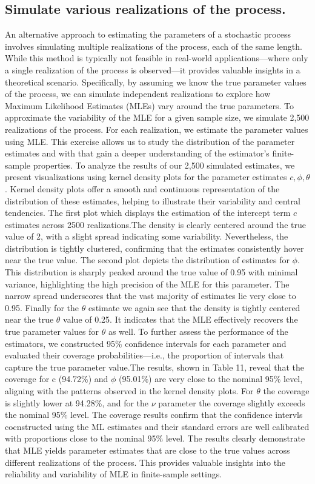 \documentclass[12pt]{article}
\begin{document}
\subsection{Simulate various realizations of the process.}
An alternative approach to estimating the parameters of a stochastic process involves simulating multiple realizations of the process, each of the same length. 
While this method is typically not feasible in real-world applications—where only a single realization of the process is observed—it provides valuable insights in a theoretical scenario. Specifically, by assuming we know the true parameter values of the process, we can simulate independent realizations to explore how Maximum Likelihood Estimates (MLEs) vary around the true parameters.
To approximate the variability of the MLE for a given sample size, we simulate 2,500 realizations of the process. For each realization, we estimate the parameter values using MLE. This exercise allows us to study the distribution of the parameter estimates and with that gain a deeper understanding of the estimator's finite-sample properties.
To analyze the results of our 2,500 simulated estimates, we present visualizations using kernel density plots for the parameter estimates  $c, \phi,\theta$.
Kernel density plots offer a smooth and continuous representation of the distribution of these estimates, helping to illustrate their variability and central tendencies.
The first plot which displays the estimation of the intercept term $c$ estimates across 2500 realizations.The density is clearly centered around the true value of 2, with a slight spread indicating some variability. Nevertheless, the distribution is tightly clustered, confirming that the estimates consistently hover near the true value.
The second plot depicts the distribution of estimates for $\phi$. This distribution is sharply peaked around the true value of 0.95 with minimal variance, highlighting the high precision of the MLE for this parameter. The narrow spread underscores that the vast majority of estimates lie very close to 0.95.
Finally for the $\theta$ estimate we again see that the density is tightly centered near the true $\theta$ value of 0.25. It indicates that the MLE effectively recovers the true parameter values for $\theta$ as well.
To further assess the performance of the estimators, we constructed 95\% confidence intervals for each parameter and evaluated their coverage probabilities—i.e., the proportion of intervals that capture the true parameter value.The results, shown in Table 11, reveal that the coverage for 
c (94.72\%) and $\phi$ (95.01\%) are very close to the nominal 95\% level, aligning with the patterns observed in the kernel density plots. 
For $\theta$ the coverage is slightly lower at 94.28\%, and for the $\nu$ parameter the coverage slightly exceeds the nominal 95\% level.
The coverage results confirm that the confidence intervls cocnstructed using the ML estimates and their standard errors are well calibrated with proportions close to the nominal 95\% level.
The results clearly demonstrate that MLE yields parameter estimates that are close to the true values across different realizations of the process. This provides valuable insights into the reliability and variability of MLE in finite-sample settings.
\end{document}
